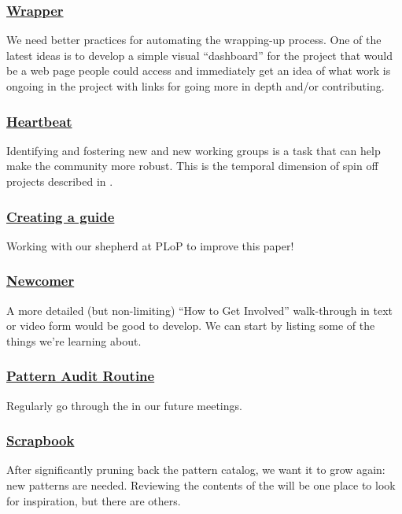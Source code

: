 \subsubsection*{\hyperref[sec:Wrapper]{Wrapper}}  We need better practices for automating the wrapping-up process. One of the latest ideas is to develop a simple visual ``dashboard'' for the project that would be a web page people could access and immediately get an idea of what work is ongoing in the project with links for going more in depth and/or contributing.

\subsubsection*{\hyperref[sec:Heartbeat]{Heartbeat}} Identifying and fostering new  and new working groups is a task that can help make the community more robust.  This is the temporal dimension of spin off projects described in .

\subsubsection*{\hyperref[sec:Creating_a_guide]{Creating a guide}}
Working with our shepherd at PLoP to improve this paper!

\subsubsection*{\hyperref[sec:Newcomer]{Newcomer}} A more detailed (but non-limiting) ``How to Get Involved'' walk-through in text or video form would be good to develop. We can start by listing some of the things we're learning about.

\subsubsection*{\hyperref[sec:Pattern_Audit_Routine]{Pattern Audit Routine}} Regularly go through the  in our future meetings.

\subsubsection*{\hyperref[sec:Scrapbook]{Scrapbook}} After significantly pruning back the pattern catalog, we want it to grow again: new patterns are needed.  Reviewing the contents of the  will be one place to look for inspiration, but there are others.




